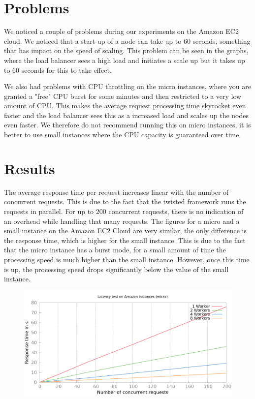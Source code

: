 \documentclass[paper=a4, fontsize=11pt]{scrartcl} %
\numberwithin{equation}{section} %
\numberwithin{figure}{section} %
\numberwithin{table}{section} %
\begin{document}
\section{Problems}
We noticed a couple of problems during our experiments on the Amazon EC2 cloud. We noticed that a start-up of a node can take up to 60 seconds, something that has impact on the speed of scaling. This problem can be seen in the graphs, where the load balancer sees a high load and initiates a scale up but it takes up to 60 seconds for this to take effect. 

We also had problems with CPU throttling on the micro instances, where you are granted a "free" CPU burst for some minutes and then restricted to a very low amount of CPU. This makes the average request processing time skyrocket even faster and the load balancer sees this as a increased load and scales up the nodes even faster. We therefore do not recommend running this on micro instances, it is better to use small instances where the CPU capacity is guaranteed over time.

\section{Results}

The average response time per request increases linear with the number of concurrent requests. This is due to the fact that the twisted framework runs the requests in parallel. For up to 200 concurrent requests, there is no indication of an overhead while handling that many requests. The figures for a micro and a small instance on the Amazon EC2 Cloud are very similar, the only difference is the response time, which is higher for the small instance. This is due to the fact that the micro instance has a burst mode, for a small amount of time the processing speed is much higher than the small instance. However, once this time is up, the processing speed drops significantly below the value of the small instance. 

\begin{figure}[h!]
\includegraphics[width=\columnwidth]{../plot/latency_fixed.png}
\end{figure}
\end{document}
